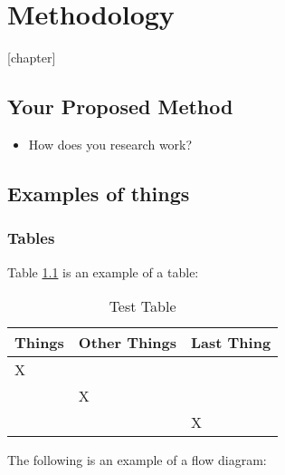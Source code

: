 
\glsresetall %
\chapter[Methodology]{Methodology}\label{ch:Methodology}

[chapter]

\section{Your Proposed Method}
\begin{itemize}
	\item{How does you research work?}
\end{itemize}

\section[Examples]{Examples of things}

\subsection{Tables}
Table \ref{tab:testTable} is an example of a table:

\begin{table}[!htbp]
	\centering
	\caption{Test Table}
	\begin{tabular}{|l|l|l|} %
		\hline
		Things & Other Things & Last Thing \\
		\hline
		X & ~ & ~ \\
		\hline
		~ & X & ~ \\
		\hline
		~ & ~ & X \\
		\hline
	\end{tabular}
	\label{tab:testTable}
\end{table}

\clearpage

The following is an example of a flow diagram:  

